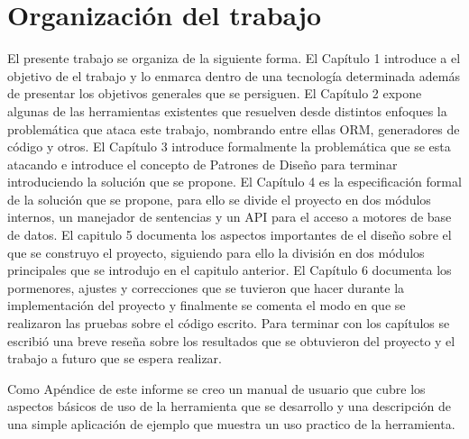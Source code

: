 \section{Organización del trabajo}
%
El presente trabajo se organiza de la siguiente forma. El Capítulo 1 introduce a el objetivo de el trabajo y lo enmarca dentro de una tecnología determinada además de presentar los objetivos generales que se persiguen. El Capítulo 2 expone algunas de las herramientas existentes que resuelven desde distintos enfoques la problemática que ataca este trabajo, nombrando entre ellas ORM, generadores de código y otros. El Capítulo 3 introduce formalmente la problemática que se esta atacando e introduce el concepto de Patrones de Diseño para terminar introduciendo la solución que se propone. El Capítulo 4 es la especificación formal de la solución que se propone, para ello se divide el proyecto en dos módulos internos, un manejador de sentencias y un API para el acceso a motores de base de datos. El capitulo 5 documenta los aspectos importantes de el diseño sobre el que se construyo el proyecto, siguiendo para ello la división en dos módulos principales que se introdujo en el capitulo anterior. El Capítulo 6 documenta los pormenores, ajustes y correcciones que se tuvieron que hacer durante la implementación del proyecto y finalmente se comenta el modo en que se realizaron las pruebas sobre el código escrito. Para terminar con los capítulos se escribió una breve reseña sobre los resultados que se obtuvieron del proyecto y el trabajo a futuro que se espera realizar.

Como Apéndice de este informe se creo un manual de usuario que cubre los aspectos básicos de uso de la herramienta que se desarrollo y una descripción de una simple aplicación de ejemplo que muestra un uso practico de la herramienta.